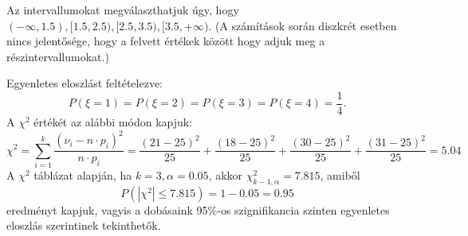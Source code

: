 \documentclass[a4paper]{article}
\begin{document}
\bigskip

Az intervallumokat megválaszthatjuk úgy, hogy $(-\infty, 1.5), [1.5, 2.5), [2.5, 3.5), [3.5, +\infty)$.
(A számítások során diszkrét esetben nincs jelentősége, hogy a felvett értékek között hogy adjuk meg a részintervallumokat.)

Egyenletes eloszlást feltételezve:
\[
P(\xi = 1) = P(\xi = 2) = P(\xi = 3) = P(\xi = 4) = \dfrac{1}{4}.
\]
A $\chi^2$ értékét az alábbi módon kapjuk:
\[
\displaystyle
\chi^2 =
\sum_{i=1}^{k} \dfrac{(\nu_i - n \cdot p_i)^2}{n \cdot p_i}
=
\dfrac{(21 - 25)^2}{25} +
\dfrac{(18 - 25)^2}{25} +
\dfrac{(30 - 25)^2}{25} +
\dfrac{(31 - 25)^2}{25} = 5.04
\]
A $\chi^2$ táblázat alapján, ha $k = 3, \alpha = 0.05$, akkor $\chi_{k-1, \alpha}^2 = 7.815$, amiből
\[
P\left(|\chi^2| \leq 7.815\right) = 1 - 0.05 = 0.95
\]
eredményt kapjuk, vagyis a dobásaink 95\%-os szignifikancia szinten egyenletes eloszlás szerintinek tekinthetők.
\end{document}

